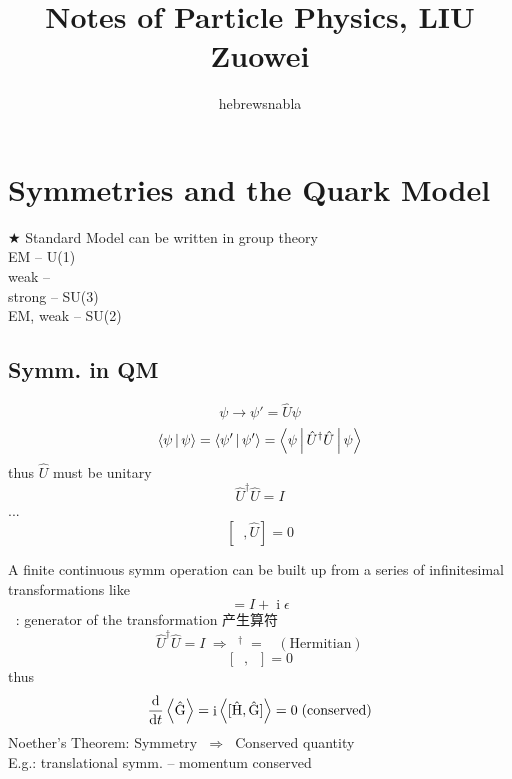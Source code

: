 \documentclass[a4paper]{article}
\title{Notes of Particle Physics, LIU Zuowei}
\author{hebrewsnabla}
\DeclareMathOperator{\I}{\mathrm{i}}
\DeclareMathOperator{\ra}{\rightarrow}
\DeclareMathOperator{\dra}{\;\Rightarrow\;}
\newcommand{\bk}[2]{\Braket{#1|#2}}
\DeclareMathOperator{\hH}{\hat{H}}
\DeclareMathOperator{\hU}{\hat{U}}
\DeclareMathOperator{\hG}{\hat{G}}
\numberwithin{equation}{section}
\begin{document}
\maketitle

\tableofcontents

\newpage

\setcounter{section}{8}
\section{Symmetries and the Quark Model}
$ \bigstar $
Standard Model can be written in group theory\\
EM -- U(1)\\
weak -- \\
strong -- SU(3)\\
EM, weak -- SU(2)
\subsection{Symm. in QM}
\begin{equation}\label{key}
\psi \ra \psi' = \hat{U}\psi
\end{equation}
\begin{equation}\label{key}
\bk{\psi}{\psi} = \bk{\psi'}{\psi'} = \Braket{\psi | \hat{U}^\dagger \hat{U} | \psi}
\end{equation}
thus $ \hat{U} $ must be unitary
\begin{equation}\label{key}
\hat{U}^\dagger \hat{U} = I
\end{equation}
...
\begin{equation}\label{key}
[\hH, \hat{U}] = 0
\end{equation}

A finite continuous symm operation can be built up from a series of infinitesimal transformations like
\begin{equation}\label{key}
\hU = I + \I\epsilon\hG
\end{equation}
$ \hG $: generator of the transformation 产生算符
\begin{equation}\label{key}
\hat{U}^\dagger \hat{U} = I \dra \hG^\dagger = \hG \;(\text{Hermitian})
\end{equation}
\begin{equation}\label{key}
[\hH, \hG] = 0
\end{equation}
thus
\begin{equation}\label{key}
\dv{t}\ev{\hG} = \I\ev{[\hH, \hG]} = 0 \;(\text{conserved})
\end{equation}
Noether's Theorem: Symmetry $ \dra $ Conserved quantity\\
E.g.: translational symm. -- momentum conserved\\
\end{document}
